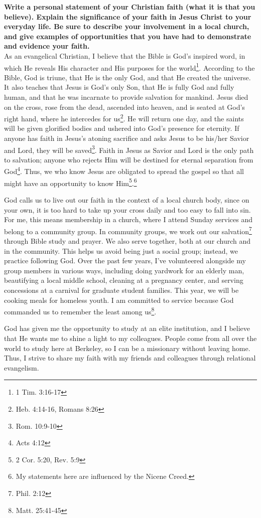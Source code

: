 \documentclass{article}
\begin{document}
	
\pagestyle{plain}

\textbf{Write a personal statement of your Christian faith (what it is that you believe). Explain the significance of your faith in Jesus Christ to your everyday life. Be sure to describe your involvement in a local church, and give examples of opportunities that you have had to demonstrate and evidence your faith.}\\

As an evangelical Christian, I believe that the Bible is God's inspired word, in which He reveals His character and His purposes for the world\footnote{1 Tim. 3:16-17}.
According to the Bible, God is triune, that He is the only God, and that He created the universe.
It also teaches that Jesus is God's only Son, that He is fully God and fully human, and that he was incarnate to provide salvation for mankind.  
Jesus died on the cross, rose from the dead, ascended into heaven, and is seated at God's right hand, where he intercedes for us\footnote{Heb. 4:14-16, Romans 8:26}. 
He will return one day, and the saints will be given glorified bodies and ushered into God's presence for eternity.
If anyone has faith in Jesus's atoning sacrifice and asks Jesus to be his/her Savior and Lord, they will be saved\footnote{Rom. 10:9-10}.
Faith in Jesus as Savior and Lord is the only path to salvation; anyone who rejects Him will be destined for eternal separation from God\footnote{Acts 4:12}.  Thus, we who know Jesus are obligated to spread the gospel so that all might have an opportunity to know Him\footnote{2 Cor. 5:20, Rev. 5:9}.\footnote{My statements here are influenced by the Nicene Creed.}

God calls us to live out our faith in the context of a local church body, since on your own, it is too hard to take up your cross daily and too easy to fall into sin.
For me, this means membership in a church, where I attend Sunday services and belong to a community group.  
In community groups, we work out our salvation\footnote{Phil. 2:12} through Bible study and prayer.  We also serve together, both at our church and in the community.  This helps us avoid being just a social group; instead, we practice following God.
Over the past few years, I've volunteered alongside my group members in various ways, including doing yardwork for an elderly man, beautifying a local middle school, cleaning at a pregnancy center, and serving concessions at a carnival for graduate student families.  This year, we will be cooking meals for homeless youth.
I am committed to service because God commanded us to remember the least among us\footnote{Matt. 25:41-45}.

God has given me the opportunity to study at an elite institution, and I believe that He wants me to shine a light to my colleagues.  People come from all over the world to study here at Berkeley, so I can be a missionary without leaving home.  Thus, I strive to share my faith with my friends and colleagues through relational evangelism.
\end{document}
